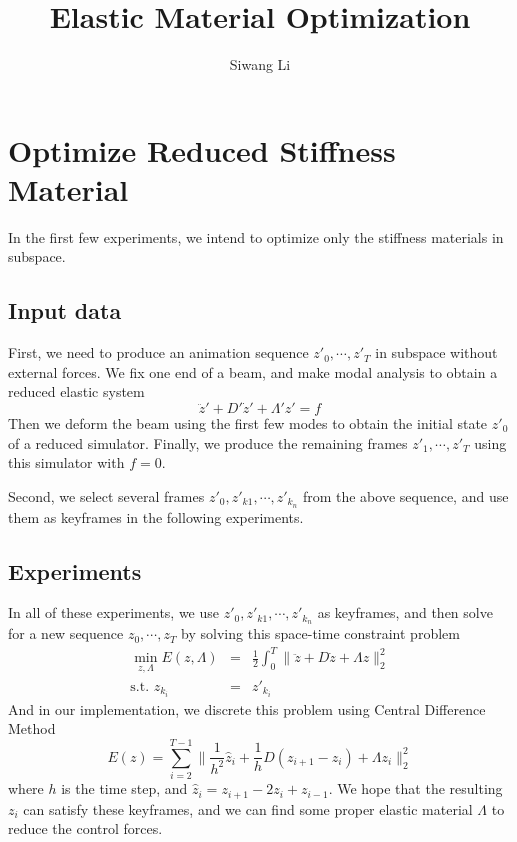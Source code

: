 \documentclass[9pt,twocolumn]{extarticle}
\author{Siwang Li}
\title{Elastic Material Optimization}
\begin{document}
\maketitle

\setlength{\parskip}{0.5ex}

\section{Optimize Reduced Stiffness Material}\label{sec:optim-reduc-stiffn}
In the first few experiments, we intend to optimize only the stiffness materials
in subspace.

\subsection{Input data}
First, we need to produce an animation sequence $z'_0,\cdots,z'_{T}$ in subspace
without external forces. We fix one end of a beam, and make modal analysis to
obtain a reduced elastic system
\begin{equation} \label{mq}
  \ddot{z}' + D'\dot{z}' + \Lambda'z' = f
\end{equation} 
Then we deform the beam using the first few modes to obtain the initial state
$z'_0$ of a reduced simulator. Finally, we produce the remaining frames
$z'_1,\cdots,z'_{T}$ using this simulator with $f=0$.

Second, we select several frames $z'_{0},z'_{k1},\cdots,z'_{k_n}$ from the above
sequence, and use them as keyframes in the following experiments.

\subsection{Experiments}
In all of these experiments, we use $z'_{0},z'_{k1},\cdots,z'_{k_n}$ as keyframes,
and then solve for a new sequence $z_0,\cdots,z_{T}$ by solving this
space-time constraint problem
\begin{eqnarray} \label{sp}
  \min_{z,\Lambda} E(z,\Lambda) &=& \frac{1}{2} \int_{0}^{T}\|\ddot{z} +
  D\dot{z} + \Lambda z\|_2^2\\
  \mbox{s.t. } z_{k_i} &=& z'_{k_i}
\end{eqnarray}
And in our implementation, we discrete this problem using Central Difference
Method
\begin{equation}\label{spd}
  E(z) = \sum_{i=2}^{T-1} \|\frac{1}{h^2}\hat{z}_i+\frac{1}{h}D(z_{i+1}-z_{i})+
  \Lambda z_i\|_2^2
\end{equation}
where $h$ is the time step, and $\hat{z}_i=z_{i+1}-2z_{i}+z_{i-1}$.  We hope
that the resulting $z_i$ can satisfy these keyframes, and we can find some
proper elastic material $\Lambda$ to reduce the control forces.
\end{document}
